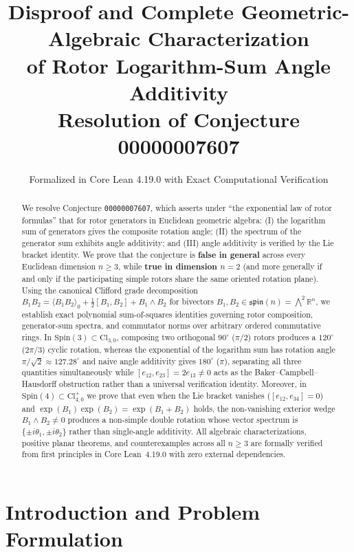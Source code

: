 \documentclass[11pt]{article}
\title{\textbf{Disproof and Complete Geometric-Algebraic Characterization\\
of Rotor Logarithm-Sum Angle Additivity}\\
\large Resolution of Conjecture 00000007607}
\author{Formalized in Core Lean 4.19.0 with Exact Computational Verification}
\date{}
\theoremstyle{definition}
\newcommand{\Cl}{\mathrm{Cl}}
\newcommand{\Spin}{\mathrm{Spin}}
\newcommand{\spinlie}{\mathfrak{spin}}
\newcommand{\grade}[2]{\langle #1 \rangle_{#2}}
\begin{document}
\maketitle

\begin{abstract}
We resolve Conjecture \texttt{00000007607}, which asserts under ``the exponential law of
rotor formulas'' that for rotor generators in Euclidean geometric algebra: (I) the logarithm
sum of generators gives the composite rotation angle; (II) the spectrum of the generator sum
exhibits angle additivity; and (III) angle additivity is verified by the Lie bracket identity.
We prove that the conjecture is \textbf{false in general} across every Euclidean dimension
$n \ge 3$, while \textbf{true in dimension $n = 2$} (and more generally if and only if the
participating simple rotors share the same oriented rotation plane). Using the canonical
Clifford grade decomposition $B_1 B_2 = \grade{B_1 B_2}{0} + \frac{1}{2}[B_1,B_2] + B_1 \wedge B_2$
for bivectors $B_1, B_2 \in \spinlie(n) = \bigwedge^2 \mathbb{R}^n$, we establish exact
polynomial sum-of-squares identities governing rotor composition, generator-sum spectra, and
commutator norms over arbitrary ordered commutative rings. In $\Spin(3) \subset \Cl_{3,0}$,
composing two orthogonal $90^\circ$ ($\pi/2$) rotors produces a $120^\circ$ ($2\pi/3$) cyclic
rotation, whereas the exponential of the logarithm sum has rotation angle $\pi/\sqrt{2} \approx
127.28^\circ$ and naive angle additivity gives $180^\circ$ ($\pi$), separating all three
quantities simultaneously while $[e_{12}, e_{23}] = 2e_{13} \neq 0$ acts as the
Baker--Campbell--Hausdorff obstruction rather than a universal verification identity. Moreover,
in $\Spin(4) \subset \Cl_{4,0}^+$ we prove that even when the Lie bracket vanishes
($[e_{12}, e_{34}] = 0$) and $\exp(B_1)\exp(B_2) = \exp(B_1 + B_2)$ holds, the non-vanishing
exterior wedge $B_1 \wedge B_2 \neq 0$ produces a non-simple double rotation whose vector
spectrum is $\{\pm i\theta_1, \pm i\theta_2\}$ rather than single-angle additivity. All
algebraic characterizations, positive planar theorems, and counterexamples across all $n \ge 3$
are formally verified from first principles in Core Lean~4.19.0 with zero external dependencies.
\end{abstract}

\section{Introduction and Problem Formulation}
\end{document}
